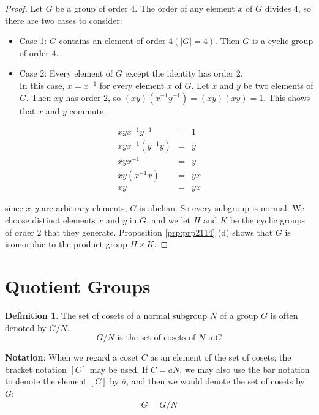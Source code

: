 \documentclass[
]{book}
\providecommand{\tightlist}{%
  \setlength{\itemsep}{0pt}\setlength{\parskip}{0pt}}
\theoremstyle{definition}
\newtheorem{definition}{Definition}[chapter]
\theoremstyle{definition}
\theoremstyle{definition}
\theoremstyle{definition}
\theoremstyle{remark}
\begin{document}
\begin{proof}
Let \(G\) be a group of order 4. The order of any element \(x\) of \(G\) divides 4, so there are two cases to consider:

\begin{itemize}
\tightlist
\item
  Case 1: \(G\) contains an element of order \(4 (|G|=4)\). Then \(G\) is a cyclic group of order \(4\).
\item
  Case 2: Every element of \(G\) except the identity has order \(2\).\\
  In this case, \(x = x^{-1}\) for every element \(x\) of \(G\). Let \(x\) and \(y\) be two elements of \(G\). Then \(xy\) has order \(2\), so \((xy)(x^{-1}y^{-1}) = (xy)(xy) = 1\). This shows that \(x\) and \(y\) commute,
\end{itemize}

\begin{eqnarray}
xyx^{-1}y^{-1} &=& 1\\
xyx^{-1}(y^{-1} y) &=& y\\
xyx^{-1} &=& y\\
xy(x^{-1}x) &=& yx\\
xy &=& yx
\end{eqnarray}

since \(x,y\) are arbitrary elements, \(G\) is abelian. So every subgroup is normal. We choose distinct elements \(x\) and \(y\) in \(G\), and we let \(H\) and \(K\) be the cyclic groups of order 2 that they generate. Proposition \ref{prp:prp2114} (d) shows that \(G\) is isomorphic to the product group \(H \times K\).
\end{proof}

\hypertarget{quotient-groups}{%
\section{Quotient Groups}\label{quotient-groups}}

\begin{definition}
\protect\hypertarget{def:unnamed-chunk-52}{}\label{def:unnamed-chunk-52}The set of cosets of a normal subgroup \(N\) of a group \(G\) is often denoted by \(G / N\).
\[G / N \text{ is the set of cosets of $N$ in} G\]
\end{definition}

\textbf{Notation}: When we regard a coset \(C\) as an element of the set of cosets, the bracket notation \([C]\)
may be used.
If \(C = aN\), we may also use the bar notation to denote the element \([C]\) by \(\overline{a}\),
and then we would denote the set of cosets by \(\overline{G}\):
\[\overline{G} = G /N\]
\end{document}
